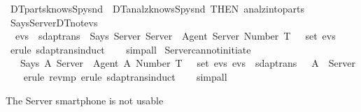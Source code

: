 \begin{isabellebody}
  \isamarkupfalse%
  \ DT{}{\isacharunderscore}parts{\isacharunderscore}knows{\isacharunderscore}Spy{\isacharunderscore}snd\ {\isacharequal}\ DT{}{\isacharunderscore}analz{\isacharunderscore}knows{\isacharunderscore}Spy{\isacharunderscore}snd\ {\isacharbrackleft}THEN\ analz{\isacharunderscore}into{\isacharunderscore}parts{\isacharbrackright}%
  \isadelimdocument
  \endisadelimdocument
  \isatagdocument
  \isamarkuptrue%
  \endisatagdocument
  {\isafolddocument}%
  \isadelimdocument
  \endisadelimdocument
  \isamarkupfalse%
  \ Says{\isacharunderscore}Server{\isacharunderscore}DT{}{\isacharunderscore}not{\isacharunderscore}evs\ {\isacharcolon}\isanewline
  \ \ {\isachardoublequoteopen}evs\ {\isasymin}\ sdaptrans\ {\isasymLongrightarrow}\ Says\ Server\ Server\ {\isasymlbrace}\ Agent\ Server{\isacharcomma}\ Number\ T\ {\isasymrbrace}\ {\isasymnotin}\ set\ evs{\isachardoublequoteclose}\isanewline
  \isadelimproof
  \isanewline
  \ \ %
  \endisadelimproof
  \isatagproof
  \isamarkupfalse%
  \ {\isacharparenleft}erule\ sdaptrans{\isachardot}induct{\isacharparenright}\isanewline
  \ \ \isamarkupfalse%
  \ {\isacharparenleft}simp{\isacharunderscore}all{\isacharparenright}\isanewline
  \isamarkupfalse%
  \endisatagproof
  {\isafoldproof}%
  \isadelimproof
  \isanewline
  \endisadelimproof
  \isanewline
  \isamarkupfalse%
  \ Server{\isacharunderscore}cannot{\isacharunderscore}initiate\ {\isacharcolon}\isanewline
  \ \ {\isachardoublequoteopen}{\isasymlbrakk}\ Says\ A\ Server\ {\isasymlbrace}\ Agent\ A{\isacharcomma}\ Number\ T\ {\isasymrbrace}\ {\isasymin}\ set\ evs{\isacharsemicolon}\ evs\ {\isasymin}\ sdaptrans\ {\isasymrbrakk}\ {\isasymLongrightarrow}\ A\ {\isasymnoteq}\ Server{\isachardoublequoteclose}\isanewline
  \isadelimproof
  \isanewline
  \ \ %
  \endisadelimproof
  \isatagproof
  \isamarkupfalse%
  \ {\isacharparenleft}erule\ rev{\isacharunderscore}mp{\isacharcomma}\ erule\ sdaptrans{\isachardot}induct{\isacharparenright}\isanewline
  \ \ \isamarkupfalse%
  \ {\isacharparenleft}simp{\isacharunderscore}all{\isacharparenright}\isanewline
  \isamarkupfalse%
  \endisatagproof
  {\isafoldproof}%
  \isadelimproof
  \endisadelimproof
  \begin{isamarkuptext}%
  The Server smartphone is not usable%
  \end{isamarkuptext}\isamarkuptrue%

\end{isabellebody}
